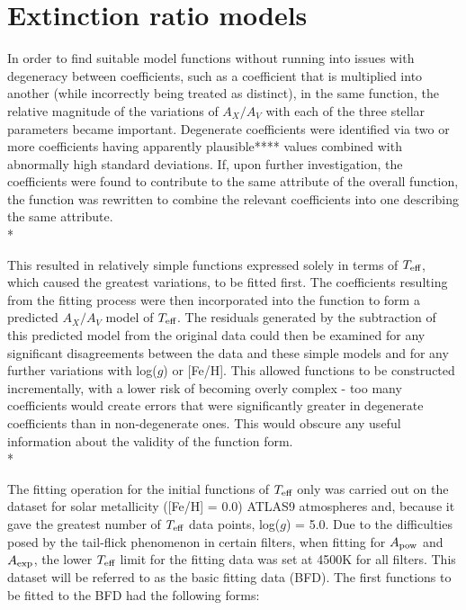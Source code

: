 \documentclass[12pt, a4paper]{report}
\begin{document}

\section{Extinction ratio models} \label{ext_models}

In order to find suitable model functions without running into issues with degeneracy between coefficients, such as a coefficient that is multiplied into another (while incorrectly being treated as distinct), in the same function, the relative magnitude of the variations of $A_{X}/A_{V}$ with each of the three stellar parameters became important. Degenerate coefficients were identified via two or more coefficients having apparently plausible**** values combined with abnormally high standard deviations. If, upon further investigation, the coefficients were found to contribute to the same attribute of the overall function, the function was rewritten to combine the relevant coefficients into one describing the same attribute.\\*

This resulted in relatively simple functions expressed solely in terms of $T_{\textnormal{eff}}$, which caused the greatest variations, to be fitted first. The coefficients resulting from the fitting process were then incorporated into the function to form a predicted $A_{X}/A_{V}$ model of $T_{\textnormal{eff}}$. The residuals generated by the subtraction of this predicted model from the original data could then be examined for any significant disagreements between the data and these simple models and for any further variations with log($g$) or [Fe/H]. This allowed functions to be constructed incrementally, with a lower risk of becoming overly complex - too many coefficients would create errors that were significantly greater in degenerate coefficients than in non-degenerate ones. This would obscure any useful information about the validity of the function form. \\*

The fitting operation for the initial functions of $T_{\textnormal{eff}}$ only was carried out on the dataset for solar metallicity ([Fe/H] = 0.0) ATLAS9 atmospheres and, because it gave the greatest number of $T_{\textnormal{eff}}$ data points, log($g$) = 5.0. Due to the difficulties posed by the tail-flick phenomenon in certain filters, when fitting for $A_{\textnormal{pow}}$ and $A_{\textnormal{exp}}$, the lower $T_{\textnormal{eff}}$ limit for the fitting data was set at 4500K for all filters. This dataset will be referred to as the basic fitting data (BFD). The first functions to be fitted to the BFD had the following forms:
\end{document}
